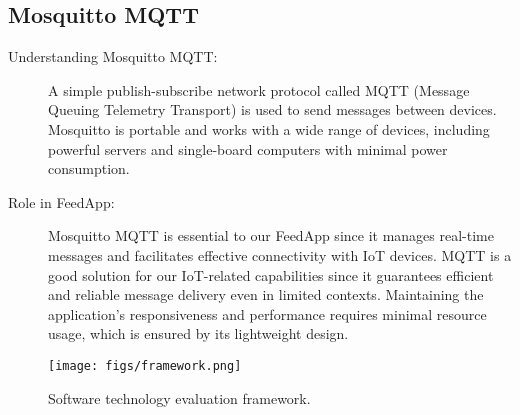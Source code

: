\subsection{Mosquitto MQTT}
\begin{description}
 \item[Understanding Mosquitto MQTT:]
A simple publish-subscribe network protocol called MQTT (Message Queuing Telemetry Transport) is used to send messages between devices. Mosquitto is portable and works with a wide range of devices, including powerful servers and single-board computers with minimal power consumption.

 \item[Role in FeedApp:]
Mosquitto MQTT is essential to our FeedApp since it manages real-time messages and facilitates effective connectivity with IoT devices. MQTT is a good solution for our IoT-related capabilities since it guarantees efficient and reliable message delivery even in limited contexts. Maintaining the application's responsiveness and performance requires minimal resource usage, which is ensured by its lightweight design.
\end{description}

\begin{figure}
  \centering
  \texttt{[image: figs/framework.png]}
  \caption{Software technology evaluation framework.}
  \label{fig:framework}
\end{figure}
